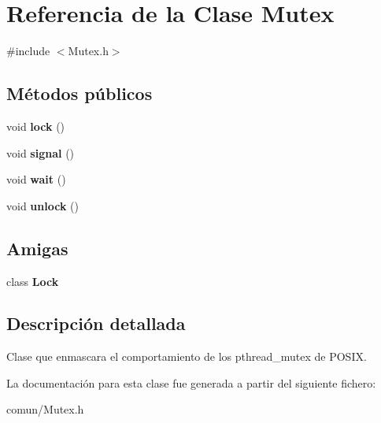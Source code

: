 \hypertarget{classMutex}{\section{\-Referencia de la \-Clase \-Mutex}
\label{classMutex}
}


{\ttfamily \#include $<$\-Mutex.\-h$>$}

\subsection*{\-Métodos públicos}
\begin{DoxyCompactItemize}
\item 
\hypertarget{classMutex_ad91be808bf0a60a16f10b897ec246d3a}{void {\bfseries lock} ()}\label{classMutex_ad91be808bf0a60a16f10b897ec246d3a}

\item 
\hypertarget{classMutex_aa1d3e908c776046ace50916fa6a3681f}{void {\bfseries signal} ()}\label{classMutex_aa1d3e908c776046ace50916fa6a3681f}

\item 
\hypertarget{classMutex_a70e3b0177eeb334bf8e7d42fa3edcc38}{void {\bfseries wait} ()}\label{classMutex_a70e3b0177eeb334bf8e7d42fa3edcc38}

\item 
\hypertarget{classMutex_a546a5b797ba29959357586aa2b3740a8}{void {\bfseries unlock} ()}\label{classMutex_a546a5b797ba29959357586aa2b3740a8}

\end{DoxyCompactItemize}
\subsection*{\-Amigas}
\begin{DoxyCompactItemize}
\item 
\hypertarget{classMutex_a5bf7608e05250fb524a1229bcf83ece3}{class {\bfseries \-Lock}}\label{classMutex_a5bf7608e05250fb524a1229bcf83ece3}

\end{DoxyCompactItemize}


\subsection{\-Descripción detallada}
\-Clase que enmascara el comportamiento de los pthread\-\_\-mutex de \-P\-O\-S\-I\-X. 

\-La documentación para esta clase fue generada a partir del siguiente fichero\-:\begin{DoxyCompactItemize}
\item 
comun/\-Mutex.\-h\end{DoxyCompactItemize}
